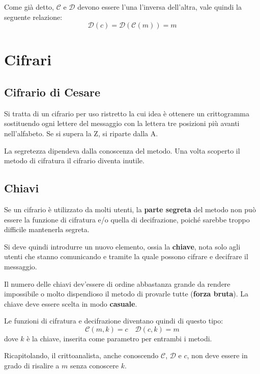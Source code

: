 Come gi\`a detto, $\mathcal{C}$ e $\mathcal{D}$ devono essere l'una l'inversa dell'altra, vale quindi la seguente
relazione:
\[ \mathcal{D}(c) = \mathcal{D}(\mathcal{C}(m)) = m \]

\section{Cifrari}
\subsection{Cifrario di Cesare}
Si tratta di un cifrario per uso ristretto la cui idea \`e ottenere un crittogramma sostituendo ogni lettere del messaggio
con la lettera tre posizioni pi\`u avanti nell'alfabeto. Se si supera la Z, si riparte dalla A.

La segretezza dipendeva dalla conoscenza del metodo. Una volta scoperto il metodo di cifratura il cifrario diventa
inutile.

\subsection{Chiavi}
Se un cifrario \`e utilizzato da molti utenti, la \textbf{parte segreta} del metodo non pu\`o essere la funzione di
cifratura e/o quella di decifrazione, poich\'e sarebbe troppo difficile mantenerla segreta.

Si deve quindi introdurre un nuovo elemento, ossia la \textbf{chiave}, nota solo agli utenti che stanno comunicando e
tramite la quale possono cifrare e decifrare il messaggio.

Il numero delle chiavi dev'essere di ordine abbastanza grande da rendere impossibile o molto dispendioso il metodo di
provarle tutte (\textbf{forza bruta}). La chiave deve essere scelta in modo \textbf{casuale}.

Le funzioni di cifratura e decifrazione diventano quindi di questo tipo:
\[ \mathcal{C}(m, k) = c \quad \mathcal{D}(c, k) = m \]
dove $k$ \`e la chiave, inserita come parametro per entrambi i metodi.

Ricapitolando, il crittoanalista, anche conoscendo $\mathcal{C}$, $\mathcal{D}$ e $c$, non deve essere in grado di
risalire a $m$ senza conoscere $k$.


